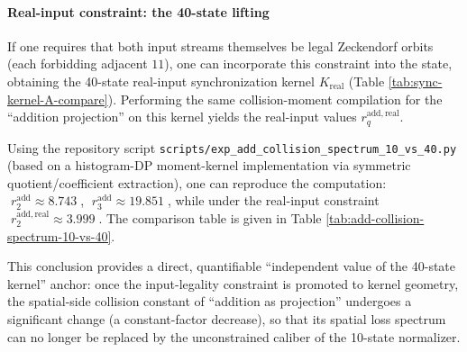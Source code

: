 \paragraph{Real-input constraint: the 40-state lifting}
If one requires that both input streams themselves be legal Zeckendorf orbits (each forbidding adjacent \(11\)), one can incorporate this constraint into the state, obtaining the 40-state real-input synchronization kernel \(K_{\mathrm{real}}\) (Table \ref{tab:sync-kernel-A-compare}).
Performing the same collision-moment compilation for the ``addition projection'' on this kernel yields the real-input values \(r^{\mathrm{add,real}}_q\).

\begin{remark}\label{rem:add-collision-spectrum-10-vs-40}
Using the repository script \texttt{scripts/exp\_add\_collision\_spectrum\_10\_vs\_40.py} (based on a histogram-DP moment-kernel implementation via symmetric quotient/coefficient extraction), one can reproduce the computation:
\(\;r^{\mathrm{add}}_2\approx 8.743\;\),
\(\;r^{\mathrm{add}}_3\approx 19.851\;\),
while under the real-input constraint
\(\;r^{\mathrm{add,real}}_2\approx 3.999\;\).
The comparison table is given in Table \ref{tab:add-collision-spectrum-10-vs-40}.


This conclusion provides a direct, quantifiable ``independent value of the 40-state kernel'' anchor: once the input-legality constraint is promoted to kernel geometry, the spatial-side collision constant of ``addition as projection'' undergoes a significant change (a constant-factor decrease), so that its spatial loss spectrum can no longer be replaced by the unconstrained caliber of the 10-state normalizer.
\end{remark}
